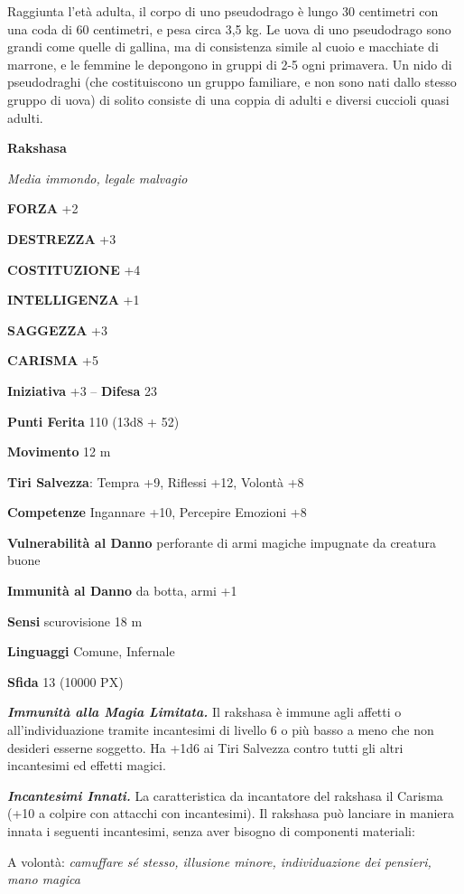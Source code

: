 \begin{multicols}{2}
	Raggiunta l'età adulta, il corpo di uno pseudodrago è lungo 30 centimetri con una coda di 60 centimetri, e pesa circa 3,5 kg. Le uova di uno pseudodrago sono grandi come quelle di gallina, ma di consistenza simile al cuoio e macchiate di marrone, e le femmine le depongono in gruppi di 2-5 ogni primavera. Un nido di pseudodraghi (che costituiscono un gruppo familiare, e non sono nati dallo stesso gruppo di uova) di solito consiste di una coppia di adulti e diversi cuccioli quasi adulti.


	\medskip{}\textbf{Rakshasa}

	\textit{Media immondo, legale malvagio}

	\textbf{FORZA} +2

	\textbf{DESTREZZA} +3

	\textbf{COSTITUZIONE} +4

	\textbf{INTELLIGENZA} +1

	\textbf{SAGGEZZA} +3

	\textbf{CARISMA} +5

	\textbf{Iniziativa} +3 -- \textbf{Difesa} 23

	\textbf{Punti Ferita} 110 (13d8 + 52)

	\textbf{Movimento} 12 m

	\textbf{Tiri Salvezza}: Tempra +9, Riflessi +12, Volontà +8

	\textbf{Competenze} Ingannare +10, Percepire Emozioni +8

	\textbf{Vulnerabilità al Danno} perforante di armi magiche impugnate da
	creatura buone

	\textbf{Immunità al Danno} da botta, armi +1

	\textbf{Sensi} scurovisione 18 m

	\textbf{Linguaggi} Comune, Infernale

	\textbf{Sfida} 13 (10000 PX)

	\textit{\textbf{Immunità alla Magia Limitata.}} Il rakshasa è immune agli affetti o all'individuazione tramite incantesimi di livello 6 o più basso a meno che non desideri esserne soggetto. Ha +1d6 ai Tiri Salvezza contro tutti gli altri incantesimi ed effetti magici.

	\textit{\textbf{Incantesimi Innati.}} La caratteristica da incantatore del rakshasa il Carisma (+10 a colpire  con attacchi con incantesimi). Il rakshasa può lanciare in maniera innata i seguenti incantesimi, senza aver bisogno di componenti materiali:

	A volontà: \textit{camuffare sé stesso, illusione minore, individuazione} \textit{dei pensieri, mano magica}


\end{multicols}
